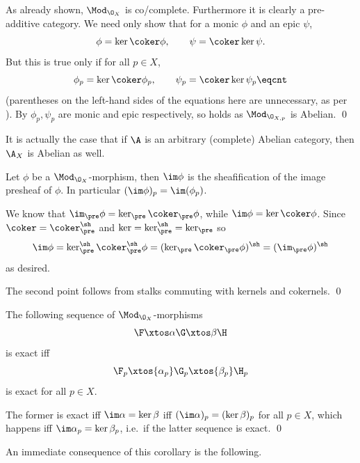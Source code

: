 \bproof

    As already shown, $\Mod_{\O_X}$ is co/complete.
    Furthermore it is clearly a pre-additive category.
    We need only show that for a monic $\phi$ and an epic $\psi$,
    $$ \phi = \ker\coker\phi,\qquad \psi = \coker\ker\psi . $$
    But this is true only if for all $p\in X$,
    $$ \phi_p = \ker\coker\phi_p,\qquad \psi_p = \coker\ker\psi_p \eqcnt $$
    (parentheses on the left-hand sides of the equations here are unnecessary, as per ).
    By  $\phi_p,\psi_p$ are monic and epic respectively, so \gotoleqn{} holds as
    $\Mod_{\O_{X,p}}$ is Abelian.
    \qed

\eproof

\bnote

    It is actually the case that if $\A$ is an arbitrary (complete) Abelian category, then $\A_X$ is Abelian as well.

\enote

\blemm

    Let $\phi$ be a $\Mod_{\O_X}$-morphism, then $\im\phi$ is the sheafification of the image presheaf of $\phi$.
    In particular $(\im\phi)_p=\im(\phi_p)$.

\elemm

\bproof

    We know that $\im_\pre\phi=\ker_\pre\coker_\pre\phi$, while $\im\phi=\ker\coker\phi$.
    Since $\coker=\coker_\pre^\sh$ and $\ker=\ker_\pre^\sh=\ker_\pre$ so
    $$ \im\phi = \ker_\pre^\sh\coker_\pre^\sh\phi = (\ker_\pre\coker_\pre\phi)^\sh = (\im_\pre\phi)^\sh $$
    as desired.

    The second point follows from stalks commuting with kernels and cokernels.
    \qed

\eproof

\bcoro[name={exactnessonstalks}]

    The following sequence of $\Mod_{\O_X}$-morphisms
    $$ \F\xtos\alpha\G\xtos\beta\H $$
    is exact iff
    $$ \F_p\xtos{\alpha_p}\G_p\xtos{\beta_p}\H_p $$
    is exact for all $p\in X$.

\ecoro

\bproof

    The former is exact iff $\im\alpha=\ker\beta$ iff $(\im\alpha)_p=(\ker\beta)_p$ for all $p\in X$, which happens iff
    $\im\alpha_p=\ker\beta_p$, i.e.\ if the latter sequence is exact.
    \qed

\eproof

An immediate consequence of this corollary is the following.

